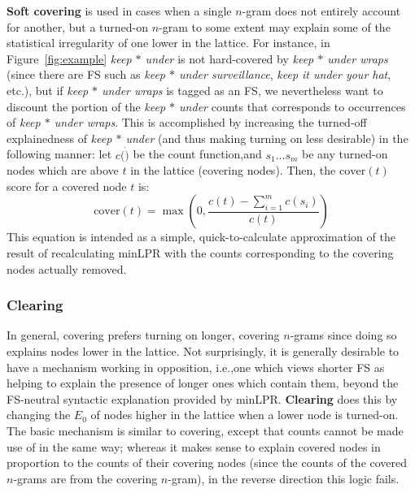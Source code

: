 \documentclass[11pt,letterpaper]{article}
\makeatletter
\def \ie {i.e.,\@ }
\def \etc {etc.\@ }
\newcommand{\dotts}{...}
\newcommand{\gap}{$*$\xspace}
\newcommand{\ex}[1]{\textit{#1}\xspace}
\newcommand{\termdef}[1]{\textbf{#1}\xspace}
\newcommand{\cover}{\ensuremath{\text{cover}}\xspace}
\newcommand{\figref}[2][]{Figure#1~\ref{#2}\xspace}
\makeatother
\begin{document}
\termdef{Soft covering} is used in cases when a single $n$-gram does not entirely account for another, but a turned-on $n$-gram to some extent may explain some of the statistical irregularity of one lower in the lattice. For instance, in \figref{fig:example} \ex{keep \gap under} is not hard-covered by \ex{keep \gap under wraps} (since there are FS such as \ex{keep \gap under surveillance}, \ex{keep it under your hat}, \etc), but if \ex{keep \gap under wraps} is tagged as an FS, we nevertheless want to discount the portion of the \ex{keep \gap under} counts that corresponds to occurrences of \ex{keep \gap under wraps}. This is accomplished by increasing the turned-off explainedness of \ex{keep \gap under} (and thus making turning on less desirable) in the following manner: let $c(\dot)$ be the count function,and $s_1\dotts s_m$ be any turned-on nodes which are above $t$ in the lattice (covering nodes). Then, the $\cover(t)$ score for a covered node $t$ is:
\begin{displaymath}
\cover(t) = \max(0,\frac{c(t) - \sum_{i=1}^{m}{c(s_i)}}{c(t)})
\end{displaymath}
This equation is intended as a simple, quick-to-calculate approximation of the result of recalculating minLPR with the counts corresponding to the covering nodes actually removed.

\subsubsection{Clearing}

In general, covering prefers turning on longer, covering $n$-grams since doing so explains nodes lower in the lattice. Not surprisingly, it is generally desirable to have a mechanism working in opposition, \ie one which views shorter FS as helping to explain the presence of longer ones which contain them, beyond the FS-neutral syntactic explanation provided by minLPR. \termdef{Clearing} does this by changing the $E_0$ of nodes higher in the lattice when a lower node is turned-on. The basic mechanism is similar to covering, except that counts cannot be made use of in the same way; whereas it makes sense to explain covered nodes in proportion to the counts of their covering nodes (since the counts of the covered $n$-grams are from the covering $n$-gram), in the reverse direction this logic fails. 
\end{document}
